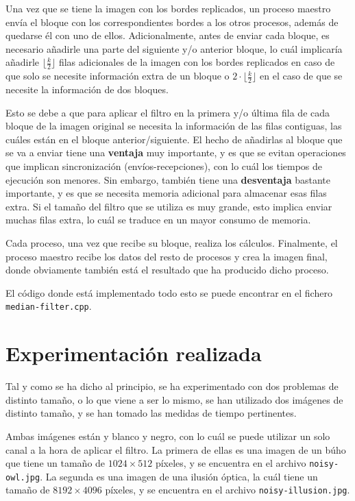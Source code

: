 \documentclass[11pt,a4paper]{article}
\begin{document}
Una vez que se tiene la imagen con los bordes replicados, un proceso maestro envía el bloque con
los correspondientes bordes a los otros procesos, además de quedarse él con uno de ellos.
Adicionalmente, antes de enviar cada bloque, es necesario añadirle una parte del siguiente y/o
anterior bloque, lo cuál implicaría añadirle $\lfloor \frac{k}{2} \rfloor$ filas adicionales
de la imagen con los bordes replicados en caso de que solo se necesite información extra de un
bloque o $2 \cdot \lfloor \frac{k}{2} \rfloor$ en el caso de que se necesite la información de
dos bloques.

Esto se debe a que para aplicar el filtro en la primera y/o última
fila de cada bloque de la imagen original se necesita la información de las filas
contiguas, las cuáles están en el bloque anterior/siguiente. El hecho de añadirlas al bloque
que se va a enviar tiene una \textbf{ventaja} muy importante, y es que se evitan operaciones que
implican sincronización (envíos-recepciones), con lo cuál los tiempos de ejecución son menores.
Sin embargo, también tiene una \textbf{desventaja} bastante importante, y es que se necesita
memoria adicional para almacenar esas filas extra. Si el tamaño del filtro que se utiliza es muy
grande, esto implica enviar muchas filas extra, lo cuál se traduce en un mayor consumo de memoria.

Cada proceso, una vez que recibe su bloque, realiza los cálculos. Finalmente, el proceso maestro
recibe los datos del resto de procesos y crea la imagen final, donde obviamente también está el
resultado que ha producido dicho proceso.

El código donde está implementado todo esto se puede encontrar en el fichero
\texttt{median-filter.cpp}.

\section{Experimentación realizada}

Tal y como se ha dicho al principio, se ha experimentado con dos problemas de distinto tamaño,
o lo que viene a ser lo mismo, se han utilizado dos imágenes de distinto tamaño, y se han tomado
las medidas de tiempo pertinentes.

Ambas imágenes están y blanco y negro, con lo cuál se puede utilizar un solo canal
a la hora de aplicar el filtro. La primera de ellas es una imagen de un búho que tiene
un tamaño de $1024 \times 512$ píxeles, y se encuentra en el archivo \texttt{noisy-owl.jpg}.
La segunda es una imagen de una ilusión óptica, la cuál tiene un tamaño de $8192 \times 4096$
píxeles, y se encuentra en el archivo \texttt{noisy-illusion.jpg}.
\end{document}

